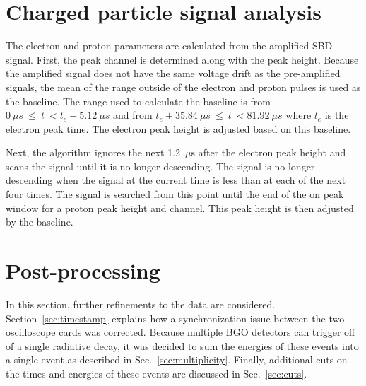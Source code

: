 \documentclass[oneside,12pt]{memoir}
\begin{document}
\section{Charged particle signal analysis}
\label{sec:epanalysis}
The electron and proton parameters are calculated from the amplified SBD signal. First, the peak channel is determined along with the peak height. Because the amplified signal does not have the same voltage drift as the pre-amplified signals, the mean of the range outside of the electron and proton pulses is used as the baseline. The range used to calculate the baseline is from $0~\mu s~\leq~t~<t_e-5.12~\mu s$ and from $t_e+35.84~\mu s~\leq~t~<81.92~\mu s$ where $t_e$ is the electron peak time. The electron peak height is adjusted based on this baseline.\par
Next, the algorithm ignores the next 1.2~$\mu$s after the electron peak height and scans the signal until it is no longer descending. The signal is no longer descending when the signal at the current time is less than at each of the next four times. The signal is searched from this point until the end of the on peak window for a proton peak height and channel. This peak height is then adjusted by the baseline.\par
\section{Post-processing}
\label{sec:post_process}
In this section, further refinements to the data are considered. Section~\ref{sec:timestamp} explains how a synchronization issue between the two oscilloscope cards was corrected. Because multiple BGO detectors can trigger off of a single radiative decay, it was decided to sum the energies of these events into a single event as described in Sec.~\ref{sec:multiplicity}. Finally, additional cuts on the times and energies of these events are discussed in Sec.~\ref{sec:cuts}.
\end{document}
